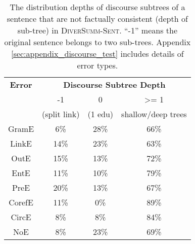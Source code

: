 \begin{table}[]
\renewcommand{\arraystretch}{0.6}
\scriptsize

    \centering
    \setlength\columnsep{3pt}
    \begin{tabular}{c|c|c|c}
    
    \toprule
    \textbf{Error} & \multicolumn{3}{c}{\textbf{Discourse Subtree Depth}}\\
    \cmidrule{2-4}
    & -1 & 0  &  >= 1 \\
 &  (split link) &  (1 edu) & shallow/deep trees \\
 \midrule 
 GramE &  6\% & 28\% & 66\% \\
 \midrule  
  LinkE & 14\% & 23\% & 63\%\\
 \midrule  
  OutE & 15\% & 13\% & 72\%\\
  \midrule
   EntE & 11\% & 10\% & 79\%\\
 \midrule  
  PreE & 20\% & 13\% & 67\%\\
 \midrule  
  CorefE & 11\% & 0\% & 89\%\\
  \midrule 
 CircE &  8\% & 8\% & 84\% \\
 \midrule
 NoE & 8\% & 23\% & 69\% \\
 
 \bottomrule
    \end{tabular}
    \caption{The distribution depths of discourse subtrees of a sentence that are not factually consistent (depth of sub-tree) in \textsc{DiverSumm-Sent}. ``-1'' means the original sentence belongs to two sub-trees. Appendix \ref{sec:appendix_discourse_test} includes details of error types. }
    \label{tab: subtree_struct}
\end{table}

